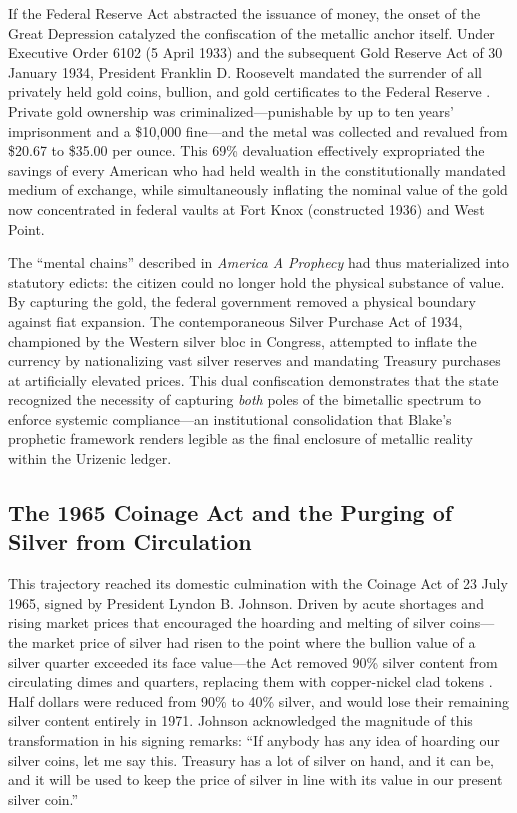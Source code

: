 \documentclass[
]{article}
\begin{document}
If the Federal Reserve Act abstracted the issuance of money, the onset
of the Great Depression catalyzed the confiscation of the metallic
anchor itself. Under Executive Order 6102 (5 April 1933) and the
subsequent Gold Reserve Act of 30 January 1934, President Franklin D.
Roosevelt mandated the surrender of all privately held gold coins,
bullion, and gold certificates to the Federal Reserve
\citep{roosevelt1933executive}. Private gold ownership was
criminalized---punishable by up to ten years' imprisonment and a
\$10,000 fine---and the metal was collected and revalued from \$20.67 to
\$35.00 per ounce. This 69\% devaluation effectively expropriated the
savings of every American who had held wealth in the constitutionally
mandated medium of exchange, while simultaneously inflating the nominal
value of the gold now concentrated in federal vaults at Fort Knox
(constructed 1936) and West Point.

The ``mental chains'' described in \emph{America A Prophecy} had thus
materialized into statutory edicts: the citizen could no longer hold the
physical substance of value. By capturing the gold, the federal
government removed a physical boundary against fiat expansion. The
contemporaneous Silver Purchase Act of 1934, championed by the Western
silver bloc in Congress, attempted to inflate the currency by
nationalizing vast silver reserves and mandating Treasury purchases at
artificially elevated prices. This dual confiscation demonstrates that
the state recognized the necessity of capturing \emph{both} poles of the
bimetallic spectrum to enforce systemic compliance---an institutional
consolidation that Blake's prophetic framework renders legible as the
final enclosure of metallic reality within the Urizenic ledger.

\subsection{The 1965 Coinage Act and the Purging of Silver from
Circulation}\label{the-1965-coinage-act-and-the-purging-of-silver-from-circulation}

This trajectory reached its domestic culmination with the Coinage Act of
23 July 1965, signed by President Lyndon B. Johnson. Driven by acute
shortages and rising market prices that encouraged the hoarding and
melting of silver coins---the market price of silver had risen to the
point where the bullion value of a silver quarter exceeded its face
value---the Act removed 90\% silver content from circulating dimes and
quarters, replacing them with copper-nickel clad tokens
\citep{johnson1965coinage}. Half dollars were reduced from 90\% to 40\%
silver, and would lose their remaining silver content entirely in 1971.
Johnson acknowledged the magnitude of this transformation in his signing
remarks: ``If anybody has any idea of hoarding our silver coins, let me
say this. Treasury has a lot of silver on hand, and it can be, and it
will be used to keep the price of silver in line with its value in our
present silver coin.''
\end{document}
